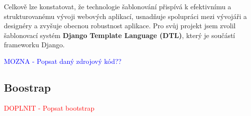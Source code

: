 Celkově lze konstatovat, že technologie šablonování přispívá k efektivnímu a strukturovanému vývoji webových aplikací, usnadňuje spolupráci mezi vývojáři a designéry a zvyšuje obecnou robustnost aplikace. Pro svůj projekt jsem zvolil šablonovací systém \textbf{Django Template Language (DTL)}, který je součástí frameworku Django.



\textcolor{blue}{MOZNA - Popsat daný zdrojový kód??}

\subsection{Boostrap}
\label{subsec:dev-technology-bootstrap}
\textcolor{red}{DOPLNIT - Popsat bootstrap}

\endinput